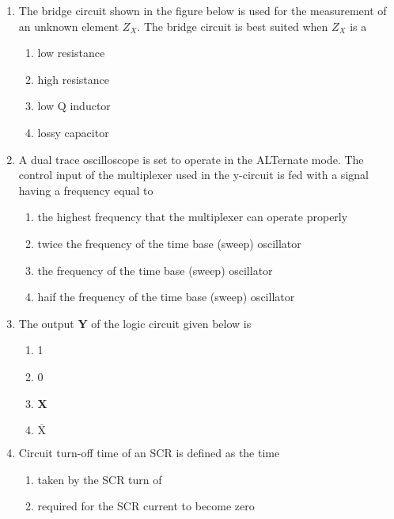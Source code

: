 \documentclass[journal]{IEEEtran}
\begin{document}
\begin{enumerate}
\begin{enumerate}
 \end{enumerate}
\item The bridge circuit shown in the figure below is used for the measurement of an unknown element $Z_X.$ The bridge circuit is best suited when $Z_X$ is a 
\begin{figure}[!ht]
\centering
\resizebox{0.5\textwidth}{!}{%

}%
\end{figure}
\begin{enumerate}
     \item low resistance 
     \item high resistance
     \item low Q inductor
     \item lossy capacitor \\
 \end{enumerate}
\item A dual trace oscilloscope is set to operate in the ALTernate mode. The control input of the multiplexer used in the y-circuit is fed with a signal having a frequency equal to 
\begin{enumerate}
    \item the highest frequency that the multiplexer can operate properly 
    \item twice the frequency of the time base (sweep) oscillator
    \item the frequency of the time base (sweep) oscillator
    \item haif the frequency of the time base (sweep) oscillator \\
\end{enumerate}
\item The output \textbf{Y} of the logic circuit given below is
\begin{figure}[!ht]
\centering
\resizebox{0.5\textwidth}{!}{%

}%
\end{figure}
\begin{enumerate}
    \item 1
    \item 0
    \item \textbf{X}
    \item \textbf{$\overline{\text{X}}$} \\
\end{enumerate}
\item Circuit turn-off time of an SCR is defined as the time
  \begin{enumerate}
    \item taken by the SCR turn of 
    \item required for the SCR current to become zero 

\end{enumerate}
\end{enumerate}
\end{document}
